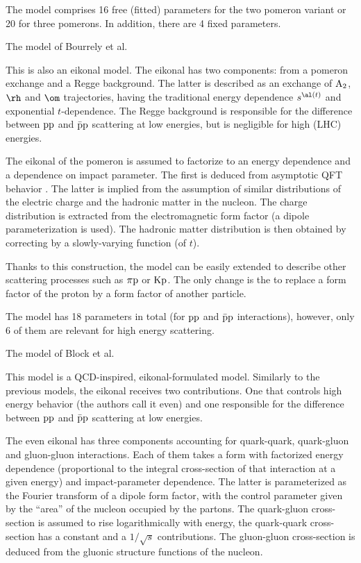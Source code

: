 The model comprises 16 free (fitted) parameters for the two pomeron variant or 20 for three pomerons. In addition, there are 4 fixed parameters.

\caption{The model of Bourrely et al. }

This is also an eikonal model. The eikonal has two components: from a pomeron exchange and a Regge background. The latter is described as an exchange of $\rm A_2$, $\rm \rh$ and $\rm \om$ trajectories, having the traditional energy dependence $s^{\al(t)}$ and exponential $t$-dependence. The Regge background is responsible for the difference between $\rm pp$ and $\rm\bar pp$ scattering at low energies, but is negligible for high (LHC) energies.

The eikonal of the pomeron is assumed to factorize to an energy dependence and a dependence on impact parameter. The first is deduced from asymptotic QFT behavior . The latter is implied from the assumption of similar distributions of the electric charge and the hadronic matter in the nucleon. The charge distribution is extracted from the electromagnetic form factor (a dipole parameterization is used). The hadronic matter distribution is then obtained by correcting by a slowly-varying function (of $t$).

Thanks to this construction, the model can be easily extended to describe other scattering processes such as $\rm \pi p$ or $\rm Kp$. The only change is the to replace a form factor of the proton by a form factor of another particle.

The model has 18 parameters in total (for $\rm pp$ and $\rm \bar p p$ interactions), however, only 6 of them are relevant for high energy scattering.

\caption{The model of Block et al. }

This model is a QCD-inspired, eikonal-formulated model. Similarly to the previous models, the eikonal receives two contributions. One that controls high energy behavior (the authors call it even) and one responsible for the difference between $\rm pp$ and $\rm\bar pp$ scattering at low energies.

The even eikonal has three components accounting for quark-quark, quark-gluon and gluon-gluon interactions. Each of them takes a form with factorized energy dependence (proportional to the integral cross-section of that interaction at a given energy) and impact-parameter dependence. The latter is parameterized as the Fourier transform of a dipole form factor, with the control parameter given by the ``area'' of the nucleon occupied by the partons. The quark-gluon cross-section is assumed to rise logarithmically with energy, the quark-quark cross-section has a constant and a $1/\sqrt s$ contributions. The gluon-gluon cross-section is deduced from the gluonic structure functions of the nucleon.

